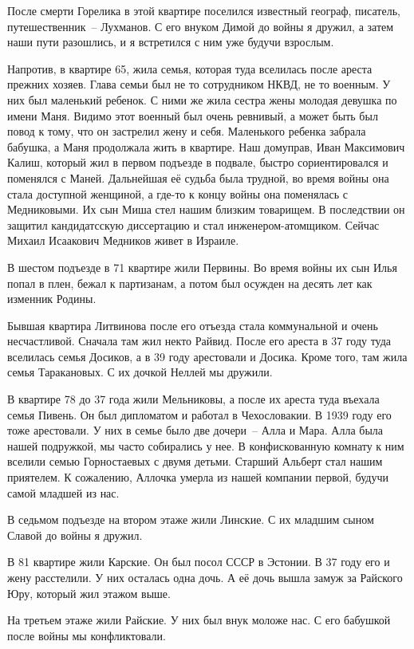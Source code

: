 После смерти Горелика в этой квартире поселился известный географ, писатель, путешественник~-- Лухманов.
С его внуком Димой до войны я дружил, а затем наши пути разошлись, и я встретился с ним уже будучи взрослым.

Напротив, в квартире 65, жила семья, которая туда вселилась после ареста прежних хозяев. Глава семьи был не то сотрудником НКВД, не то военным. У них был маленький ребенок. С ними же жила сестра жены молодая девушка по имени Маня. Видимо этот военный был очень ревнивый, а может быть был повод к тому, что он застрелил жену и себя. Маленького ребенка забрала бабушка, а Маня продолжала жить в квартире. Наш домуправ, Иван Максимович Калиш, который жил в первом подъезде в подвале, быстро сориентировался и поменялся с Маней. Дальнейшая её судьба была трудной, во время войны она стала доступной женщиной, а где-то к концу войны она поменялась с Медниковыми. Их сын Миша стел нашим близким товарищем. В последствии он защитил кандидатсскую диссертацию и стал инженером-атомщиком. Сейчас Михаил Исаакович Медников живет в Израиле.

В шестом подъезде в 71 квартире жили Первины. Во время войны их сын Илья попал в плен, бежал к партизанам, а потом был осужден на десять лет как изменник Родины.

Бывшая квартира Литвинова после его отъезда стала коммунальной и очень несчастливой. Сначала там жил некто Райвид. После его ареста в 37 году туда вселилась семья Досиков, а в 39 году арестовали и Досика. Кроме того, там жила семья Таракановых. С их дочкой Неллей мы дружили.

В квартире 78 до 37 года жили Мельниковы, а после их ареста туда въехала семья Пивень. Он был дипломатом и работал в Чехословакии. В 1939 году его тоже арестовали. У них в семье было две дочери~-- Алла и Мара. Алла была нашей подружкой, мы часто собирались у нее. В конфискованную комнату к ним вселили семью Горностаевых с двумя детьми. Старший Альберт стал нашим приятелем. К сожалению, Аллочка умерла из нашей компании первой, будучи самой младшей из нас.

В седьмом подъезде на втором этаже жили Линские. С их младшим сыном Славой до войны я дружил.

В 81 квартире жили Карские. Он был посол СССР в Эстонии. В 37 году его и жену расстелили. У них осталась одна дочь. А её дочь вышла замуж за Райского Юру, который жил этажом выше.

На третьем этаже жили Райские. У них был внук моложе нас. С его бабушкой после войны мы конфликтовали.

